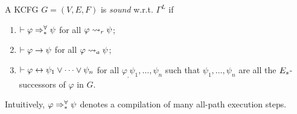 \documentclass{article}
\begin{document}
\begin{definition}
A KCFG $G = (V, E, F)$ is \emph{sound} w.r.t. $\Gamma^L$ if
\begin{enumerate}
\item $\vdash \varphi \Rightarrow^{\forall}_{*} \psi$ for all $\varphi \rightsquigarrow_r \psi$;
\item $\vdash \varphi \rightarrow \psi$ for all $\varphi \rightsquigarrow_a \psi$;
\item $\vdash \varphi \leftrightarrow \psi_1 \lor \dots \lor \psi_n$
 for all $\varphi_,\psi_1,\dots,\psi_n$ such that
 $\psi_1,\dots,\psi_n$ are all the $E_s$-successors of $\varphi$ in $G$.
\end{enumerate}
\end{definition}

Intuitively, $\varphi \Rightarrow^{\forall}_{*} \psi$ denotes a compilation of
many all-path execution steps. 
\end{document}
